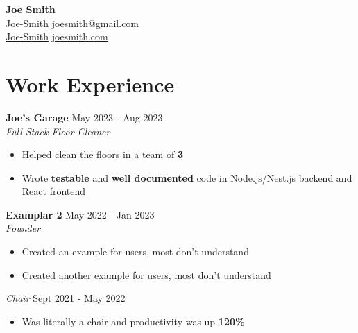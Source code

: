 \documentclass[letterpaper, 10pt]{article}
\newcommand{\iconSpace}{\hspace{2px}}
\newcommand{\bulletSpace}{\vspace{-4pt}}
\newcommand{\hSpace}{\hspace{8px}}
\newcommand{\secStartSpace}{\vspace{3pt}}
\newcommand{\secEndSpace}{\vspace{5pt}}
\newcommand{\spaceCollapse}{\vspace{-2pt}}
\newcommand{\workHeader}[3]{
\noindent \large{\textbf{{#1}}} \hfill \normalsize{#3}\vspace{2pt}\\
	\textit{#2}\vspace{-2pt}
}
\newcommand{\workSubHeader}[2]{
    \noindent \textit{#1} \hfill \normalsize{#2}
	\vspace{-2pt}
}
\newcommand{\boldlarger}[1]{{\large\textbf{#1}}}
\newcommand{\justlarge}[1]{{\large \textbf{#1}}}
\begin{document}
\begin{center} 
	{\Huge \textbf{Joe Smith}}\\
	\vspace{1px}
	{
             \iconSpace \href{https://www.linkedin.com/in/Joe-Smith/}{Joe-Smith}
		\hfill
		\href{mailto:joesmith@gmail.com}{joesmith@gmail.com} \vspace{2pt} \iconSpace {} 
        }\\
	{
		 \iconSpace \href{https://github.com/Joe-Smith}{Joe-Smith}
            \hfill
		\href{https://joesmith.com/}{joesmith.com} \iconSpace {} 
	}
\end{center}
\spaceCollapse
\spaceCollapse


\section{\color{blue} \textbf{Work Experience}}
\secStartSpace

\begin{addmargin}[0.5em]{1em}
	\workHeader{Joe's Garage}{Full-Stack Floor Cleaner}{May 2023 - Aug 2023}
	\begin{itemize}
		\item Helped clean the floors in a team of \justlarge{3}
		      \bulletSpace
            \item Wrote \boldlarger{testable} and \boldlarger{well documented} code in Node.js/Nest.js backend and React frontend
	\end{itemize}
		
	\workHeader{Examplar 2}{Founder}{May 2022 - Jan 2023}
	\begin{itemize}
		\item Created an example for users, most don't understand
		      \bulletSpace
		\item Created another example for users, most don't understand
	\end{itemize}
	\workSubHeader{Chair}{Sept 2021 - May 2022}
	\begin{itemize}
		\item Was literally a chair and productivity was up \justlarge{120\%}
	\end{itemize}
\end{addmargin}
\secEndSpace
\end{document}

